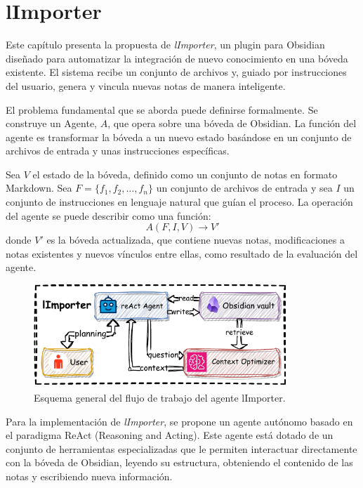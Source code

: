 \chapter{lImporter}\label{chapter:proposal}
Este capítulo presenta la propuesta de \textit{lImporter}, un plugin para Obsidian diseñado para automatizar la integración de nuevo conocimiento en una bóveda existente. El sistema recibe un conjunto de archivos y, guiado por instrucciones del usuario, genera y vincula nuevas notas de manera inteligente.

El problema fundamental que se aborda puede definirse formalmente. Se construye un Agente, $A$, que opera sobre una bóveda de Obsidian. La función del agente es transformar la bóveda a un nuevo estado basándose en un conjunto de archivos de entrada y unas instrucciones específicas.

Sea $V$ el estado de la bóveda, definido como un conjunto de notas en formato Markdown. Sea $F = \{f_1, f_2, \dots, f_n\}$ un conjunto de archivos de entrada y sea $I$ un conjunto de instrucciones en lenguaje natural que guían el proceso. La operación del agente se puede describir como una función:
\[ A(F, I, V) \rightarrow V' \]
donde $V'$ es la bóveda actualizada, que contiene nuevas notas, modificaciones a notas existentes y nuevos vínculos entre ellas, como resultado de la evaluación del agente.

\begin{figure}[h]
    \centering
    \includegraphics[width=0.85\textwidth]{figures/limporter.pdf}
    \caption{Esquema general del flujo de trabajo del agente lImporter.}
    \label{fig:importer_schema}
\end{figure}

Para la implementación de \textit{lImporter}, se propone un agente autónomo basado en el paradigma ReAct (Reasoning and Acting). Este agente está dotado de un conjunto de herramientas especializadas que le permiten interactuar directamente con la bóveda de Obsidian, leyendo su estructura, obteniendo el contenido de las notas y escribiendo nueva información.

